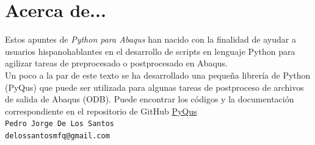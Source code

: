 \chapter*{Acerca de...}

Estos apuntes de \textit{Python para Abaqus} han nacido con la finalidad de ayudar a usuarios 
hispanohablantes en el desarrollo de scripts en lenguaje Python para agilizar tareas 
de preprocesado o postprocesado en Abaqus.\\

Un poco a la par de este texto se ha desarrollado una pequeña librería de Python (PyQus) que puede 
ser utilizada para algunas tareas de postproceso de archivos de salida de Abaqus (ODB). Puede 
encontrar los códigos y la documentación correspondiente en el repositorio de GitHub 
\href{https://github.com/JorgeDeLosSantos/pyqus}{{\color{blue} PyQus}}\\


\texttt{Pedro Jorge De Los Santos}\\
\texttt{delossantosmfq@gmail.com}\\

